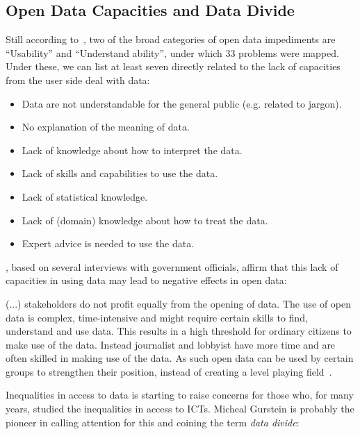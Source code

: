 \subsection{Open Data Capacities and Data Divide}
\label{sec:datadivide}

Still according to~, two of the broad categories of open data impediments are ``Usability'' and ``Understand ability'', under which 33 problems were mapped.
Under these, we can list at least seven directly related to the lack of capacities from the user side deal with data:

\begin{itemize}
	\item Data are not understandable for the general public (e.g. related to jargon). 
	\item No explanation of the meaning of data. 
	\item Lack of knowledge about how to interpret the data. 
	\item Lack of skills and capabilities to use the data. 
	\item Lack of statistical knowledge.
	\item Lack of (domain) knowledge about how to treat the data. 
	\item Expert advice is needed to use the data.
\end{itemize}

, based on several interviews with government officials, affirm that this lack of capacities in using data may lead to negative effects in open data: 

\begin{citacao}
(...) stakeholders do not profit equally from the opening of data. The use of open data is complex, time-intensive and might require certain skills to find, understand and use data. This results in a high threshold for ordinary citizens to make use of the data. Instead journalist and lobbyist have more time and are often skilled in making use of the data. As such open data can be used by certain groups to strengthen their position, instead of creating a level playing field~\cite{Zuiderwijk2014a}.
\end{citacao}

Inequalities in access to data is starting to raise concerns for those who, for many years, studied the inequalities in access to ICTs.
Micheal Gurstein is probably the pioneer in calling attention for this and coining the term \emph{data divide}: 

